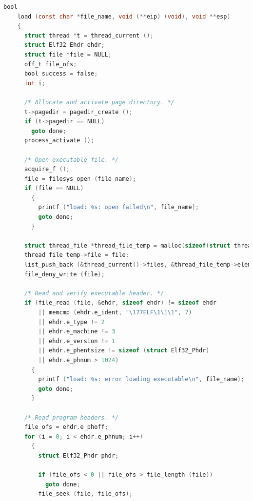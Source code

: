 \documentclass{article}
\begin{document}
\begin{lstlisting}[language=C, title=\texttt{src/userprog/process.c - load()}]
    bool
    load (const char *file_name, void (**eip) (void), void **esp) 
    {
      struct thread *t = thread_current ();
      struct Elf32_Ehdr ehdr;
      struct file *file = NULL;
      off_t file_ofs;
      bool success = false;
      int i;
    
      /* Allocate and activate page directory. */
      t->pagedir = pagedir_create ();
      if (t->pagedir == NULL) 
        goto done;
      process_activate ();
    
      /* Open executable file. */
      acquire_f ();
      file = filesys_open (file_name);
      if (file == NULL) 
        {
          printf ("load: %s: open failed\n", file_name);
          goto done; 
        }
    
      struct thread_file *thread_file_temp = malloc(sizeof(struct thread_file));
      thread_file_temp->file = file;
      list_push_back (&thread_current()->files, &thread_file_temp->elem);
      file_deny_write (file);
    
      /* Read and verify executable header. */
      if (file_read (file, &ehdr, sizeof ehdr) != sizeof ehdr
          || memcmp (ehdr.e_ident, "\177ELF\1\1\1", 7)
          || ehdr.e_type != 2
          || ehdr.e_machine != 3
          || ehdr.e_version != 1
          || ehdr.e_phentsize != sizeof (struct Elf32_Phdr)
          || ehdr.e_phnum > 1024) 
        {
          printf ("load: %s: error loading executable\n", file_name);
          goto done; 
        }
    
      /* Read program headers. */
      file_ofs = ehdr.e_phoff;
      for (i = 0; i < ehdr.e_phnum; i++) 
        {
          struct Elf32_Phdr phdr;
    
          if (file_ofs < 0 || file_ofs > file_length (file))
            goto done;
          file_seek (file, file_ofs);
    

\end{lstlisting}
\end{document}
